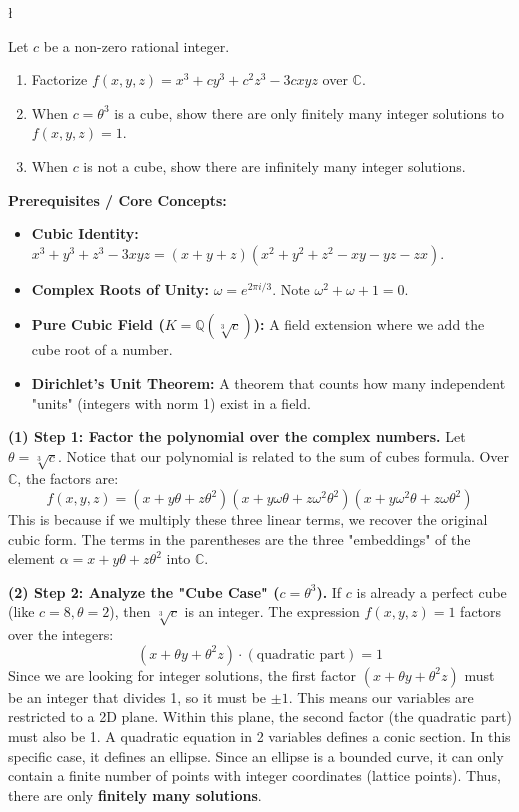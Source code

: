 \begin{exercise}
\l\label{2014:12}

\label{algebra:2014:12}Let $c$ be a non-zero rational integer.
\begin{enumerate}
    \item Factorize $f(x, y, z) = x^3 + cy^3 + c^2z^3 - 3cxyz$ over $\mathbb{C}$.
    \item When $c = \theta^3$ is a cube, show there are only finitely many integer solutions to $f(x, y, z) = 1$.
    \item When $c$ is not a cube, show there are infinitely many integer solutions.
\end{enumerate}
\end{exercise}

\begin{solution}
\textbf{Prerequisites / Core Concepts:}
\begin{itemize}
    \item \textbf{Cubic Identity:} $x^3+y^3+z^3-3xyz = (x+y+z)(x^2+y^2+z^2-xy-yz-zx)$.
    \item \textbf{Complex Roots of Unity:} $\omega = e^{2\pi i/3}$. Note $\omega^2 + \omega + 1 = 0$.
    \item \textbf{Pure Cubic Field ($K = \mathbb{Q}(\sqrt[3]{c})$):} A field extension where we add the cube root of a number.
    \item \textbf{Dirichlet's Unit Theorem:} A theorem that counts how many independent "units" (integers with norm 1) exist in a field.
\end{itemize}

\textbf{(1) Step 1: Factor the polynomial over the complex numbers.}
Let $\theta = \sqrt[3]{c}$. Notice that our polynomial is related to the sum of cubes formula.
Over $\mathbb{C}$, the factors are:
\[ f(x, y, z) = (x + y\theta + z\theta^2)(x + y\omega\theta + z\omega^2\theta^2)(x + y\omega^2\theta + z\omega\theta^2) \]
This is because if we multiply these three linear terms, we recover the original cubic form. The terms in the parentheses are the three "embeddings" of the element $\alpha = x + y\theta + z\theta^2$ into $\mathbb{C}$.

\textbf{(2) Step 2: Analyze the "Cube Case" ($c = \theta^3$).}
If $c$ is already a perfect cube (like $c=8, \theta=2$), then $\sqrt[3]{c}$ is an integer.
The expression $f(x, y, z) = 1$ factors over the integers:
\[ (x + \theta y + \theta^2 z) \cdot (\text{quadratic part}) = 1 \]
Since we are looking for integer solutions, the first factor $(x + \theta y + \theta^2 z)$ must be an integer that divides 1, so it must be $\pm 1$.
This means our variables are restricted to a 2D plane. Within this plane, the second factor (the quadratic part) must also be 1.
A quadratic equation in 2 variables defines a conic section. In this specific case, it defines an ellipse.
Since an ellipse is a bounded curve, it can only contain a finite number of points with integer coordinates (lattice points). Thus, there are only \textbf{finitely many solutions}.


\end{solution}
